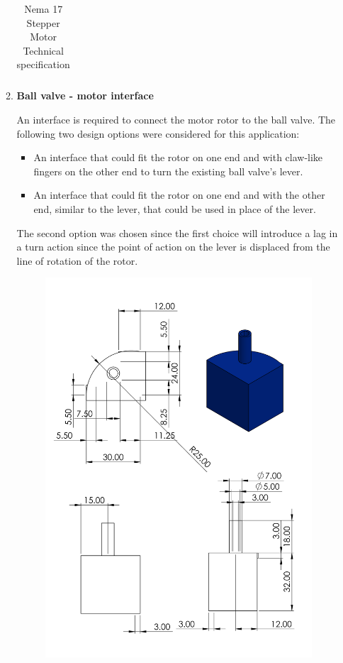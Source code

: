 \begin{enumerate}
\begin{enumerate}
\begin{longtable}[c]{|l|l|}
\caption[Nema 17 Stepper Motor Technical specification]{Nema 17 Stepper Motor Technical specification \cite{nema17}}
\label{tab:nema17_specs}
\end{longtable}
    \item \textbf{Ball valve - motor interface}
    \par
    An interface is required to connect the motor rotor to the ball valve. The following  two design options were considered for this application:
    \begin{itemize}
        \item An interface that could fit the rotor on one end and with claw-like fingers on the other end to turn the existing ball valve's lever.
        \item An interface that could fit the rotor on one end and with the other end, similar to the lever, that could be used in place of the lever.
    \end{itemize}
    \par
    The second option was chosen since the first choice will introduce a lag in a turn action since the point of action on the lever is displaced from the line of rotation of the rotor.
    \begin{figure}[H]
        \centering
        \includegraphics[height=0.5\textheight]{Figures/Interface.PNG}

\end{figure}
\end{enumerate}
\end{enumerate}
